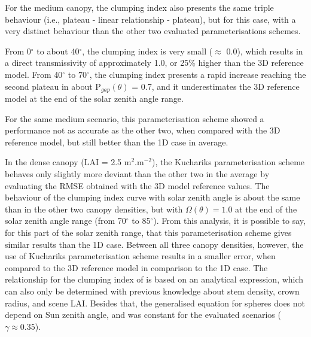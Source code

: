 \documentclass[a4paper,11pt]{report}
\begin{document}
For the medium canopy, the clumping index also presents the same triple behaviour (i.e., plateau - linear relationship - plateau), but for this case, with a very distinct behaviour than the other two evaluated parameterisations schemes.

From 0$^{\circ}$ to about 40$^{\circ}$, the clumping index is very small ($\approx$ 0.0), which results in a direct transmissivity of approximately 1.0, or 25\% higher than the 3D reference model. From 40$^{\circ}$ to 70$^{\circ}$, the clumping index presents a rapid increase reaching the second plateau in about P$_{gap}(\theta)$ = 0.7, and it underestimates the 3D reference model at the end of the solar zenith angle range.

For the same medium scenario, this parameterisation scheme showed a performance not as accurate as the other two, when compared with the 3D reference model, but still better than the 1D case in average.

In the dense canopy (LAI = 2.5 m$^2$.m$^{-2}$), the Kucharik\textquotesingle s parameterisation scheme behaves only slightly more deviant than the other two in the average by evaluating the RMSE obtained with the 3D model reference values. The behaviour of the clumping index curve with solar zenith angle is about the same than in the other two canopy densities, but with $\Omega(\theta) = 1.0$ at the end of the solar zenith angle range (from 70$^{\circ}$ to 85$^{\circ}$). From this analysis, it is possible to say, for this part of the solar zenith range, that this parameterisation scheme gives similar results than the 1D case. Between all three canopy densities, however, the use of Kucharik\textquotesingle s parameterisation scheme results in a smaller error, when compared to the 3D reference model in comparison to the 1D case. The relationship for the clumping index of \citet{Ni-Meister2010} is based on an analytical expression, which can also only be determined with previous knowledge about stem density, crown radius, and scene LAI. Besides that, the generalised equation for spheres does not depend on Sun zenith angle, and was constant for the evaluated scenarios ($\gamma \approx 0.35$).
\end{document}
